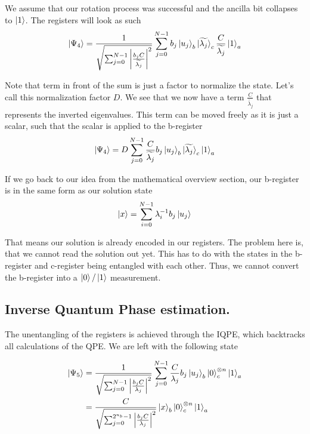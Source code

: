 We assume that our rotation process was successful and the ancilla bit collapses to $\ket 1$. 
The registers will look as such
\begin{equation}
\ket{\Psi_4}= \frac {1} {\sqrt{\sum_{j=0}^{N-1}   \left|  \frac{b_jC} {\widetilde{\lambda_j}}\right|^2   }} 
\sum_{j=0}^{N-1} b_j \ket{u_j}_b \ket{\widetilde{\lambda_j}}_c \frac{C}{\widetilde{\lambda_j}} \ket1_a
\end{equation}

Note that term in front of the sum is just a factor to normalize the state. 
Let's call this normalization factor $D$.
We see that we now have a term $\frac{C}{\widetilde{\lambda_j}}$ that represents the inverted eigenvalues. 
This term can be moved freely as it is just a scalar,  such that the scalar is applied to the b-register
\begin{equation}
\ket{\Psi_4}= D
\sum_{j=0}^{N-1} \frac{C}{\widetilde{\lambda_j}} b_j \ket{u_j}_b \ket{\widetilde{\lambda_j}}_c \ket1_a
\end{equation}

If we go back to our idea from the mathematical overview section, our b-register is in the same form as our solution state
\begin{equation}
\ket{x} = \sum_{i=0}^{N-1} \lambda_i^{-1} b_j\ket{u_j}\\
\end{equation}

That means our solution is already encoded in our registers. 
The problem here is, that we cannot read the solution out yet.
This has to do with the states in the b-register and c-register being entangled with each other. 
Thus, we cannot convert the b-register into a $\ket0 / \ket 1$ measurement.


\subsection{Inverse Quantum Phase estimation.}
The unentangling of the registers is achieved through the IQPE, which backtracks all calculations of the QPE.
We are left with the following state

\begin{equation}
\begin{split}
\ket{\Psi_5} &= \frac {1} {\sqrt{\sum_{j=0}^{N-1} \left| \frac{b_jC} {\lambda_j}\right|^2}}
\sum_{j=0}^{N-1}\frac{ C}{\lambda_j}   b_j \ket{u_j}_b \ket{0}_c^{\otimes n} \ket{1}_a\\
&= \frac {C} {\sqrt{\sum_{j=0}^{2^{n_b}-1} \left| \frac{b_jC} {\lambda_j}\right|^2}}
\ket{x}_b \ket{0}^{\otimes n}_c \ket{1}_a
\end{split}
\end{equation}

